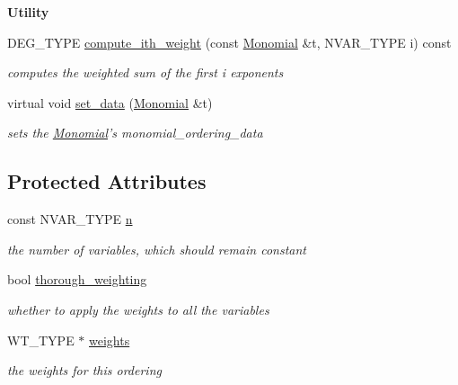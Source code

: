\begin{Indent}\textbf{ Utility}\par
\begin{DoxyCompactItemize}
\item 
\mbox{\label{class_w_grevlex_a760db9641eb6993748fb26c211bd4bb0}} 
D\+E\+G\+\_\+\+T\+Y\+PE \hyperlink{class_w_grevlex_a760db9641eb6993748fb26c211bd4bb0}{compute\+\_\+ith\+\_\+weight} (const \hyperlink{class_monomial}{Monomial} \&t, N\+V\+A\+R\+\_\+\+T\+Y\+PE i) const
\begin{DoxyCompactList}\small\item\em computes the weighted sum of the first i exponents \end{DoxyCompactList}\item 
\mbox{\label{class_w_grevlex_a2e36a3a510a046dbb330afd355d1028f}} 
virtual void \hyperlink{class_w_grevlex_a2e36a3a510a046dbb330afd355d1028f}{set\+\_\+data} (\hyperlink{class_monomial}{Monomial} \&t)
\begin{DoxyCompactList}\small\item\em sets the \hyperlink{class_monomial}{Monomial}'s {\ttfamily monomial\+\_\+ordering\+\_\+data} \end{DoxyCompactList}\end{DoxyCompactItemize}
\end{Indent}
\subsection*{Protected Attributes}
\begin{DoxyCompactItemize}
\item 
\mbox{\label{class_w_grevlex_ac8355eb8a2145189fba8dcec4b47a22f}} 
const N\+V\+A\+R\+\_\+\+T\+Y\+PE \hyperlink{class_w_grevlex_ac8355eb8a2145189fba8dcec4b47a22f}{n}
\begin{DoxyCompactList}\small\item\em the number of variables, which should remain constant \end{DoxyCompactList}\item 
\mbox{\label{class_w_grevlex_a73b55333b66eae11ee2e781c166b2421}} 
bool \hyperlink{class_w_grevlex_a73b55333b66eae11ee2e781c166b2421}{thorough\+\_\+weighting}
\begin{DoxyCompactList}\small\item\em whether to apply the weights to all the variables \end{DoxyCompactList}\item 
\mbox{\label{class_w_grevlex_a8a8d248da57c37bff15fe9400b1e04ff}} 
W\+T\+\_\+\+T\+Y\+PE $\ast$ \hyperlink{class_w_grevlex_a8a8d248da57c37bff15fe9400b1e04ff}{weights}
\begin{DoxyCompactList}\small\item\em the weights for this ordering \end{DoxyCompactList}\end{DoxyCompactItemize}
